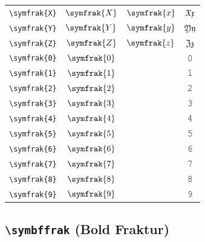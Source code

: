 \documentclass[12pt,a4paper]{article}
\begin{document}
\begin{longtable}{|c|c|c|c|}
\verb|\symfrak{X}| & $\symfrak{X}$ & $\symfrak{x}$ & $ 𝔛 𝔵 $ \\
\verb|\symfrak{Y}| & $\symfrak{Y}$ & $\symfrak{y}$ & $ 𝔜 𝔶 $ \\
\verb|\symfrak{Z}| & $\symfrak{Z}$ & $\symfrak{z}$ & $ ℨ 𝔷 $ \\
\verb|\symfrak{0}| & $\symfrak{0}$ & & 𝟶 \\
\verb|\symfrak{1}| & $\symfrak{1}$ & & 𝟷 \\
\verb|\symfrak{2}| & $\symfrak{2}$ & & 𝟸 \\
\verb|\symfrak{3}| & $\symfrak{3}$ & & 𝟹 \\
\verb|\symfrak{4}| & $\symfrak{4}$ & & 𝟺 \\
\verb|\symfrak{5}| & $\symfrak{5}$ & & 𝟻 \\
\verb|\symfrak{6}| & $\symfrak{6}$ & & 𝟼 \\
\verb|\symfrak{7}| & $\symfrak{7}$ & & 𝟽 \\
\verb|\symfrak{8}| & $\symfrak{8}$ & & 𝟾 \\
\verb|\symfrak{9}| & $\symfrak{9}$ & & 𝟿 \\
\hline
\end{longtable}

\newpage

\subsection*{\texttt{\textbackslash{}symbffrak} (Bold Fraktur)}
\end{document}
